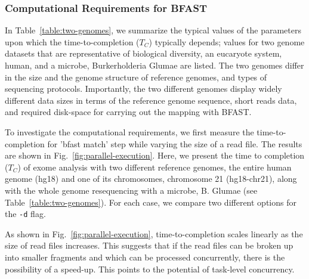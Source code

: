 \documentclass{cpeauth}
\begin{document}


\subsubsection{Computational Requirements for BFAST}


In Table~\ref{table:two-genomes}, we summarize the typical values of
the parameters upon which the time-to-completion ($T_C$) typically
depends; values for two genome datasets that are representative of
biological diversity, an eucaryote system, human, and a microbe,
Burkerholderia Glumae\cite{kim2011} are listed. The two genomes differ
in the size and the genome structure of reference genomes, and types
of sequencing protocols.  Importantly, the two different genomes
display widely different data sizes in terms of the reference genome
sequence, short reads data, and required disk-space for carrying out
the mapping with BFAST.


To investigate the computational requirements, we first measure the
time-to-completion for 'bfast match' step while varying the size of a
read file.  The results are shown in
Fig.~\ref{fig:parallel-execution}. %
Here, we present the time to completion ($T_C$) of exome analysis with
two different reference genomes, the entire human genome (hg18) and
one of its chromosomes, chromosome 21 (hg18-chr21), along with the whole genome
resequencing with a microbe, B. Glumae\cite{kim2011} (see Table~\ref{table:two-genomes}).  For
each case, we compare two different options for the \texttt{-d} flag.

As shown in Fig.~\ref{fig:parallel-execution}, time-to-completion 
scales linearly as the size of read files increases.
This suggests that if the read files can be broken up into smaller
fragments and which can be processed concurrently, there is the
possibility of a speed-up. This points to the potential of task-level
concurrency.
\end{document}
